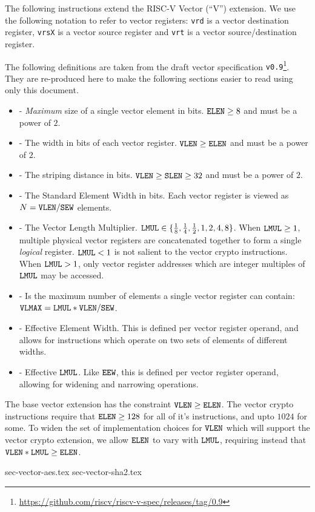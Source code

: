 
The following instructions extend the RISC-V Vector (``V'') extension.
We use the following notation to refer to vector registers:
{\tt vrd}  is a vector        destination register,
{\tt vrsX} is a vector source             register
and
{\tt vrt}  is a vector source/destination register.

The following definitions are taken from the draft
vector specification {\tt v0.9}\footnote{\url{https://github.com/riscv/riscv-v-spec/releases/tag/0.9}}.
They are re-produced here to make the following sections easier to
read using only this document.

\begin{itemize}
\item[\ELEN] - {\em Maximum} size of a single vector element in bits.
              ${\tt ELEN} \ge 8$ and must be a power of $2$.
\item[\VLEN] - The width in bits of each vector register.
              ${\tt VLEN} \ge {\tt ELEN}$ and must be a power of $2$.
\item[\SLEN] - The striping distance in bits.
              ${\tt VLEN} \ge {\tt SLEN} \ge 32$ and must be a power of $2$.
\item[\SEW]  - The Standard Element Width in bits.
              Each vector register is viewed as $N={\tt VLEN}/{\tt SEW}$ elements.
\item[\LMUL] - The Vector Length Multiplier.
              ${\tt LMUL}\in\{{1\over 8},{1\over 4},{1\over 2},1,2,4,8\}$.
              When ${\tt LMUL}\ge1$, multiple physical vector registers are
              concatenated together to form a single {\em logical} register.
              ${\tt LMUL}<1$ is not salient to the vector crypto instructions.
              When ${\tt LMUL}>1$, only vector register addresses which are
              integer multiples of ${\tt LMUL}$ may be accessed.
\item[\VLMAX]- Is the maximum number of elements a single vector register
              can contain: ${\tt VLMAX}={\tt LMUL}*{\tt VLEN}/{\tt SEW}$.
\item[\EEW]  - Effective Element Width. This is defined per vector register
              operand, and allows for instructions which operate on
              two sets of elements of different widths.
\item[\EMUL] - Effective ${\tt LMUL}$. Like ${\tt EEW}$, this is defined per vector
              register operand, allowing for widening and narrowing
              operations.
\end{itemize}

The base vector extension has the constraint ${\tt VLEN} \ge {\tt ELEN}$.
The vector crypto instructions require that ${\tt ELEN} \ge 128$ for all
of it's instructions, and upto $1024$ for some.
To widen the set of implementation choices for ${\tt VLEN}$ which will support
the vector crypto extension, we allow ${\tt ELEN}$ to vary with ${\tt LMUL}$,
requiring instead that ${\tt VLEN}*{\tt LMUL} \ge {\tt ELEN}$.


{sec-vector-aes.tex}
{sec-vector-sha2.tex}


